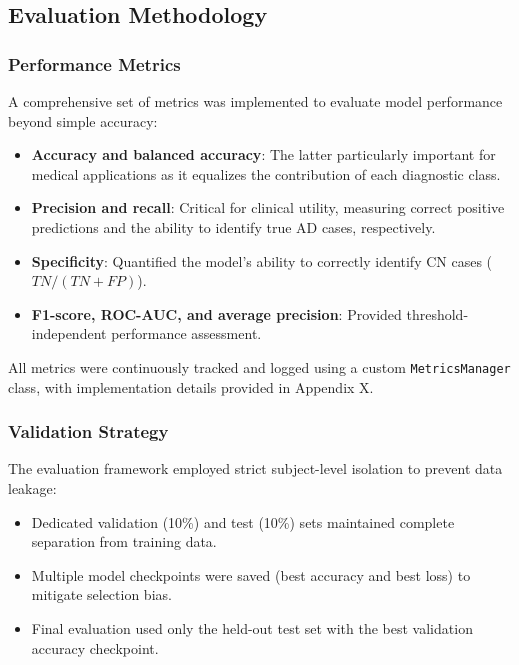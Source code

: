 \documentclass[12pt, a4paper]{article}
\begin{document}
\subsection{Evaluation Methodology}

\subsubsection{Performance Metrics}

A comprehensive set of metrics was implemented to evaluate model performance beyond simple accuracy:

\begin{itemize}
    \item \textbf{Accuracy and balanced accuracy}: The latter particularly important for medical applications as it equalizes the contribution of each diagnostic class.
    
    \item \textbf{Precision and recall}: Critical for clinical utility, measuring correct positive predictions and the ability to identify true AD cases, respectively.
    
    \item \textbf{Specificity}: Quantified the model's ability to correctly identify CN cases ($TN/(TN+FP)$).
    
    \item \textbf{F1-score, ROC-AUC, and average precision}: Provided threshold-independent performance assessment.
\end{itemize}

All metrics were continuously tracked and logged using a custom \texttt{MetricsManager} class, with implementation details provided in Appendix X.

\subsubsection{Validation Strategy}

The evaluation framework employed strict subject-level isolation to prevent data leakage:

\begin{itemize}
    \item Dedicated validation (10\%) and test (10\%) sets maintained complete separation from training data.
    
    \item Multiple model checkpoints were saved (best accuracy and best loss) to mitigate selection bias.
    
    \item Final evaluation used only the held-out test set with the best validation accuracy checkpoint.
\end{itemize}
\end{document}
